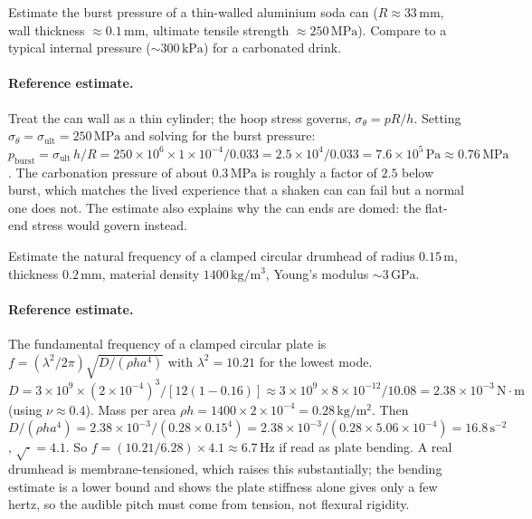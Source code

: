 \begin{exercise}
Estimate the burst pressure of a thin-walled aluminium soda can
($R \approx 33\,\si{\milli\meter}$, wall thickness $\approx 0.1\,
\si{\milli\meter}$, ultimate tensile strength $\approx 250\,\text{
MPa}$). Compare to a typical internal pressure ($\sim 300\,\text{
kPa}$) for a carbonated drink.

\paragraph{Reference estimate.} Treat the can wall as a thin cylinder;
the hoop stress governs, $\sigma_\theta = pR/h$. Setting $\sigma_\theta
= \sigma_{\text{ult}} = 250\,\text{MPa}$ and solving for the burst
pressure: $p_{\text{burst}} = \sigma_{\text{ult}}\,h/R = 250\times 10^6
\times 1\times 10^{-4}/0.033 = 2.5\times 10^4/0.033 = 7.6\times 10^5\,
\text{Pa} \approx 0.76\,\text{MPa}$. The carbonation pressure of about
$0.3\,\text{MPa}$ is roughly a factor of $2.5$ below burst, which
matches the lived experience that a shaken can can fail but a normal
one does not. The estimate also explains why the can ends are domed:
the flat-end stress would govern instead.
\end{exercise}

\begin{exercise}
Estimate the natural frequency of a clamped circular drumhead of
radius $0.15\,\si{\meter}$, thickness $0.2\,\si{\milli\meter}$,
material density $1400\,\si{\kilogram\per\meter\cubed}$,
Young's modulus $\sim 3\,\text{GPa}$.

\paragraph{Reference estimate.} The fundamental frequency of a clamped
circular plate is $f = (\lambda^2/2\pi)\sqrt{D/(\rho h a^4)}$ with
$\lambda^2 = 10.21$ for the lowest mode. $D = 3\times 10^9\times
(2\times 10^{-4})^3/[12(1-0.16)] \approx 3\times 10^9\times 8\times
10^{-12}/10.08 = 2.38\times 10^{-3}\,\text{N}\cdot\text{m}$ (using
$\nu \approx 0.4$). Mass per area $\rho h = 1400\times 2\times 10^{-4}
= 0.28\,\si{\kilogram\per\meter\squared}$. Then $D/(\rho h a^4) =
2.38\times 10^{-3}/(0.28\times 0.15^4) = 2.38\times 10^{-3}/(0.28\times
5.06\times 10^{-4}) = 16.8\,\text{s}^{-2}$, $\sqrt{\cdot} = 4.1$. So
$f = (10.21/6.28)\times 4.1 \approx 6.7\,\text{Hz}$ if read as plate
bending. A real drumhead is membrane-tensioned, which raises this
substantially; the bending estimate is a lower bound and shows the
plate stiffness alone gives only a few hertz, so the audible pitch
must come from tension, not flexural rigidity.
\end{exercise}

